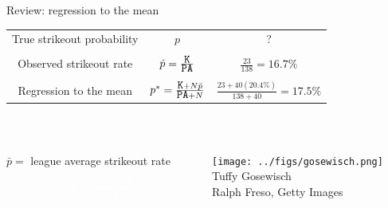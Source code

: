 \documentclass{beamer}
\begin{document}
\begin{frame}{Review: regression to the mean}
\begin{tabular}{ccc}
True strikeout probability  & $p$ & ?\\
    \vspace{2mm}\\
Observed strikeout rate     & $\hat p = \frac{\mbox{\tt K}}{\mbox{\tt PA}}$
    & $\frac{23}{138} = 16.7\%$\\
    \vspace{2mm}\\
Regression to the mean      & $p^* = \frac{\mbox{\tt K} + N\bar p}
    {\mbox{\tt PA} + N}$ & $\frac{23 + 40(20.4\%)}{138 + 40} = 17.5\%$
\end{tabular}\\
\vspace{4mm}
\begin{columns}
\begin{column}{0.6\textwidth}
\hfill {\small $\bar p =$ league average strikeout rate}\\
\vspace{1cm}
$${\color{white} N = \frac{\bar p(1 - \bar p)}{\sigma^2_T}}$$
\end{column}
\begin{column}{0.4\textwidth}
\centering
\texttt{[image: ../figs/gosewisch.png]}\\
\large Tuffy Gosewisch\\
{\color{gray}\tiny Ralph Freso, Getty Images}
\end{column}
\end{columns}
\end{frame}
\end{document}
